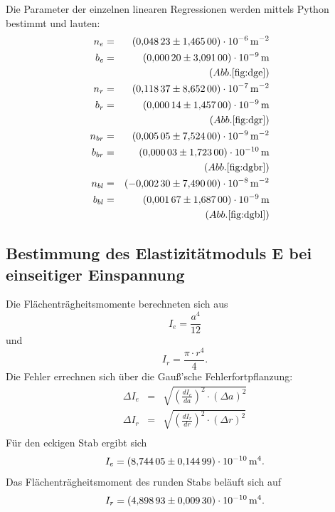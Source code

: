 Die Parameter der einzelnen linearen Regressionen werden mittels Python bestimmt und lauten:
\begin{align*}
  n_{e}  &=& \SI{0.04823 \pm 1.465e-06}{m^{-2}}\\
  b_{e}  &=& \SI{0.00020 \pm 3.091e-09}{m}\\
  &&(Abb. \ref{fig:dge})
   & \\
  n_{r}  &=& \SI{0.11837 \pm 8.652e-07}{m^{-2}}\\
  b_{r}  &=& \SI{0.00014 \pm 1.457e-09}{m}\\
  &&(Abb. \ref{fig:dgr})
   &  \\
  n_{br} &=& \SI{0.00505 \pm 7.524e-09}{m^{-2}}\\
  b_{br} &=& \SI{0.00003 \pm 1.723e-10}{m}\\
  &&(Abb. \ref{fig:dgbr})
   &  \\
  n_{bl} &=& \SI{-0.00230 \pm 7.490e-08}{m^{-2}}\\
  b_{bl} &=& \SI{ 0.00167 \pm 1.687e-09}{m}\\
  &&(Abb. \ref{fig:dgbl})
   &  \\
\end{align*}

\subsection{Bestimmung des Elastizitätmoduls E bei einseitiger Einspannung}
Die Flächenträgheitsmomente berechneten sich aus
\begin{equation}
  I_{e}= \frac{a^4}{12}
  \label{eqn:ie}
\end{equation}
 und
\begin{equation}
  I_{r}= \frac{\pi \cdot r^4}{4}.
  \label{eqn:ir}
\end{equation}
 Die Fehler errechnen sich über die Gauß'sche Fehlerfortpflanzung:
\begin{align*}
  \Delta I_{e} &=& \sqrt{ \left(\frac{d I_{e}}{da}\right)^2 \cdot \left(\Delta a \right)^2 } \\
  \Delta I_{r} &=& \sqrt{ \left(\frac{d I_{r}}{dr}\right)^2 \cdot \left(\Delta r \right)^2 } \\
\end{align*}
 Für den eckigen Stab ergibt sich
\begin{equation*}
  I_{e}=\SI{8.74405 \pm 0.14499e-10}{m^4}.
\end{equation*}
 Das Flächenträgheitsmoment des runden Stabs beläuft sich auf
\begin{equation*}
  I_{r}= \SI{4.89893 \pm 0.00930e-10}{m^4}.
\end{equation*}

